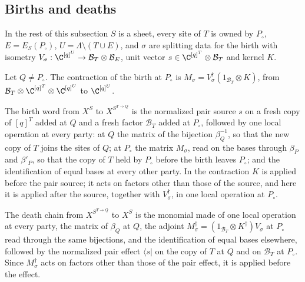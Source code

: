 \subsection{Births and deaths}

In the rest of this subsection $S$ is a sheet, every site of $T$ is owned by $P_\circ$,
$E=E_S(P_\circ)$, $U=\Lambda\setminus(T\cup E)$, and $\sigma$ are splitting data for the birth
with isometry $V_\sigma:\C^{[q]^U}\to\mathcal B_T\otimes\mathcal B_E$, unit vector
$s\in\C^{[q]^T}\otimes\mathcal B_T$ and kernel $K$.

\begin{definition}
    \label{def:party_birth_word}
    \leanok
    Let $Q\neq P_\circ$. The contraction of the birth at $P_\circ$ is
    $M_\sigma=V_\sigma^\dagger(1_{\mathcal B_T}\otimes K)$, from
    $\mathcal B_T\otimes\C^{[q]^T}\otimes\C^{[q]^U}$ to $\C^{[q]^U}$.

    The birth word from $X^S$ to $X^{S^{T\to Q}}$ is the normalized pair source $s$ on a fresh
    copy of $[q]^T$ added at $Q$ and a fresh factor $\mathcal B_T$ added at $P_\circ$, followed
    by one local operation at every party: at $Q$ the matrix of the bijection $\beta_Q^{-1}$,
    so that the new copy of $T$ joins the sites of $Q$; at $P_\circ$ the matrix $M_\sigma$, read
    on the bases through $\beta_P$ and $\beta'_P$, so that the copy of $T$ held by $P_\circ$
    before the birth leaves $P_\circ$; and the identification of equal bases at every other
    party. In \cite[proof of Lemma~6.5]{OpenAI2026PolynomialPEPS} the contraction $K$ is applied
    before the pair source; it acts on factors other than those of the source, and here it is
    applied after the source, together with $V_\sigma^\dagger$, in one local operation at
    $P_\circ$.

    The death chain from $X^{S^{T\to Q}}$ to $X^S$ is the monomial made of one local operation
    at every party, the matrix of $\beta_Q$ at $Q$, the adjoint
    $M_\sigma^\dagger=(1_{\mathcal B_T}\otimes K^\dagger)V_\sigma$ at $P_\circ$ read through
    the same bijections, and the identification of equal bases elsewhere, followed by the
    normalized pair effect $\langle s|$ on the copy of $T$ at $Q$ and on $\mathcal B_T$ at
    $P_\circ$. Since $M_\sigma^\dagger$ acts on factors other than those of the pair effect, it is
    applied before the effect.
\end{definition}

